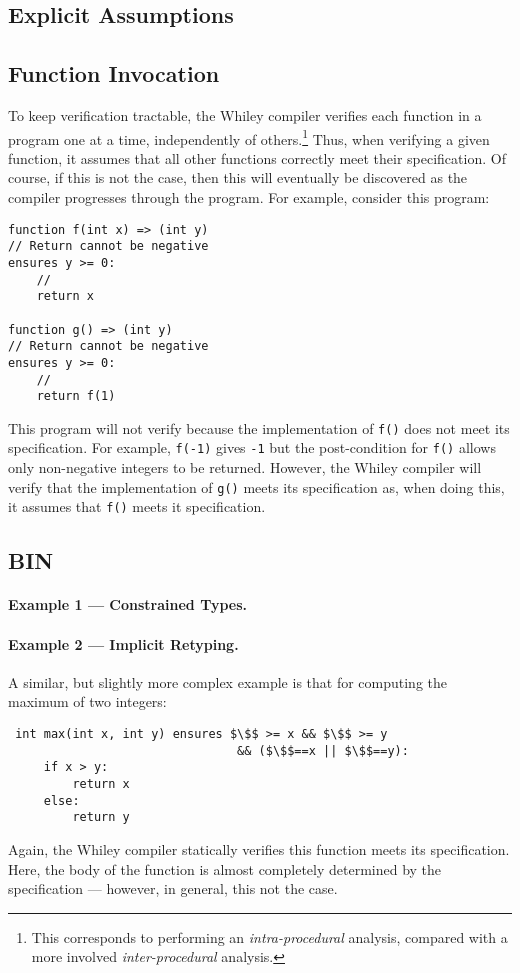 \subsection{Explicit Assumptions}

\subsection{Function Invocation}

To keep verification tractable, the Whiley compiler verifies each
function in a program one at a time, independently of
others.\footnote{This corresponds to performing an {\em
    intra-procedural} analysis, compared with a more involved {\em
    inter-procedural} analysis.}  Thus, when verifying a given
function, it assumes that all other functions correctly meet their
specification.  Of course, if this is not the case, then this will
eventually be discovered as the compiler progresses through the
program.  For example, consider this program:

\begin{lstlisting}
function f(int x) => (int y)
// Return cannot be negative
ensures y >= 0:
    //
    return x

function g() => (int y)
// Return cannot be negative
ensures y >= 0:
    //
    return f(1)
\end{lstlisting}

This program will not verify because the implementation of
\lstinline{f()} does not meet its specification.  For example,
\lstinline{f(-1)} gives \lstinline{-1} but the post-condition for
\lstinline{f()} allows only non-negative integers to be returned.
However, the Whiley compiler will verify that the implementation of
\lstinline{g()} meets its specification as, when doing this, it
assumes that \lstinline{f()} meets it specification.
 
\subsection{BIN}
\paragraph{Example 1 --- Constrained Types.}


\paragraph{Example 2 --- Implicit Retyping.}

A similar, but slightly more complex example is that for computing the
maximum of two integers:
\begin{lstlisting}
 int max(int x, int y) ensures $\$$ >= x && $\$$ >= y 
                                && ($\$$==x || $\$$==y):
     if x > y:
         return x
     else:
         return y
\end{lstlisting}
Again, the Whiley compiler statically verifies this function meets its
specification.  Here, the body of the function is almost completely
determined by the specification --- however, in general, this not the
case.

